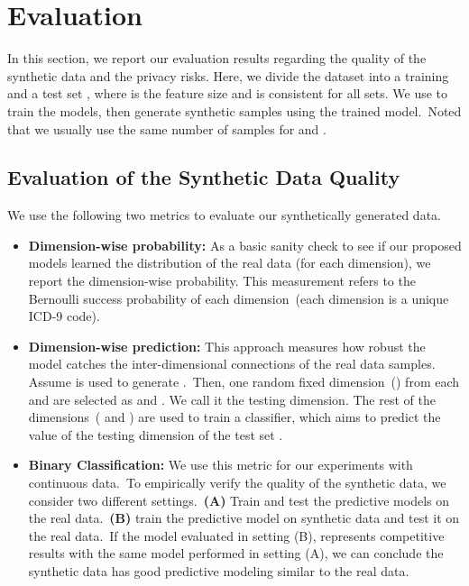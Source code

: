 \documentclass[letterpaper]{article} \usepackage{aaai20}  \usepackage{times}  \usepackage{helvet} \usepackage{courier}  \usepackage[hyphens]{url}  \usepackage{graphicx} \urlstyle{rm} \def\UrlFont{\rm}  \usepackage{graphicx}  \frenchspacing  \setlength{\pdfpagewidth}{8.5in}  \setlength{\pdfpageheight}{11in}
\begin{document}
\section{Evaluation}\label{sec:Evaluation}

In this section, we report our evaluation results regarding the quality of the synthetic data and the privacy risks. Here, we divide the dataset into a training  and a test set , where  is the feature size and is consistent for all sets. We use  to train the models, then generate synthetic samples  using the trained model.~Noted that we usually use the same number of samples for  and .

\subsection{Evaluation of the Synthetic Data Quality}\label{sec:Experimentssub:realistic}

We use the following two metrics to evaluate our synthetically generated data.

\begin{itemize}
    \item  \textbf{Dimension-wise probability:} As a basic sanity check to see if our proposed models learned the distribution of the real data (for each dimension), we report the dimension-wise probability. This measurement refers to the Bernoulli success probability of each dimension~(each dimension is a unique ICD-9 code).
    
    \item  \textbf{Dimension-wise prediction:} This approach measures how robust the model catches the inter-dimensional connections of the real data samples. Assume  is used to generate .~Then, one random fixed dimension~() from each  and  are selected as  and . We call it the testing dimension. The rest of the dimensions~( and ) are used to train a classifier, which aims to predict the value of the testing dimension of the test set .
    
    \item  \textbf{Binary Classification:} We use this metric for our experiments with continuous data.~To empirically verify the quality of the synthetic data, we consider two different settings.~\textbf{(A)} Train and test the predictive models on the real data.~\textbf{(B)} train the predictive model on synthetic data and test it on the real data.~If the model evaluated in setting (B), represents competitive results with the same model performed in setting (A), we can conclude the synthetic data has good predictive modeling similar to the real data.
\end{itemize}{}
\end{document}
